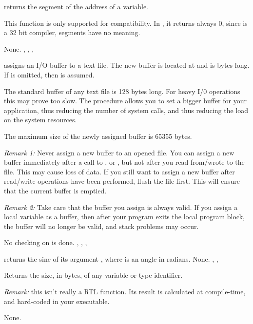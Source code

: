 \documentclass{report}
\begin{document}


{ returns the segment of the address of a variable. 

This function is only supported for compatibility. In \fpc, it 
returns always 0, since \fpc is a 32 bit compiler, segments have no meaning.
}
{None.}
{, , , }




{ assigns an I/O buffer to a text file. The new buffer is
located at  and is  bytes long. If  is omitted,
then  is assumed.

The standard buffer of any text file is 128 bytes long. For heavy I/0
operations this may prove too slow. The  procedure allows
you to set a bigger buffer for your application, thus reducing the number of
system calls, and thus reducing the load on the system resources.

The maximum size of the newly assigned buffer is 65355 bytes.

{\em Remark 1:} Never assign a new buffer to an opened file. You can assign a
new buffer immediately after a call to ,  or
, but not after you read from/wrote to the file. This may cause
loss of data. If you still want to assign a new buffer after read/write
operations have been performed, flush the file first. This will ensure that
the current buffer is emptied.

{\em Remark 2:} Take care that the buffer you assign is always valid. If you
assign a local variable as a buffer, then after your program exits the local
program block, the buffer will no longer be valid, and stack problems may
occur.
}
{No checking on  is done.}
{, , , }



{ returns the sine of its argument , where  is an
angle in radians.}
{None.}
{, , }



{ Returns the size, in bytes, of any variable or type-identifier.

 {\em Remark:} this isn't really a RTL function. Its result is calculated at
compile-time, and hard-coded in your executable.}
{None.}
{}
\end{document}

